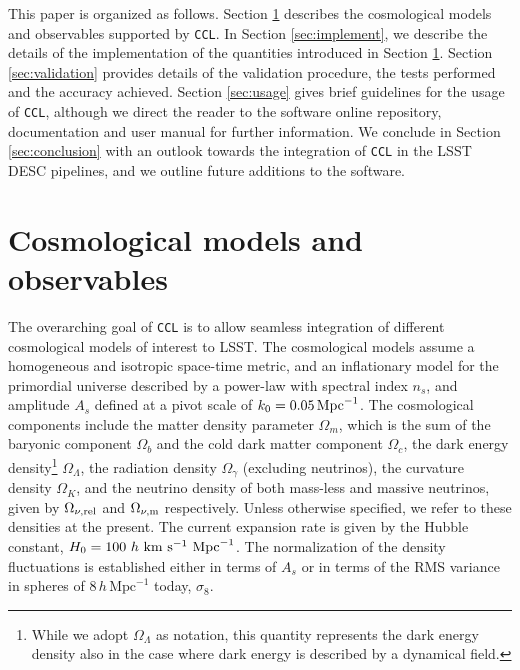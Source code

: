 \documentclass[\docopts]{\docclass}
\newcommand{\ccl}{{\tt CCL}\xspace}
\begin{document}
This paper is organized as follows. Section \ref{sec:models} describes the cosmological models and observables supported by \ccl. In Section \ref{sec:implement}, we describe the details of the implementation of the quantities introduced in Section \ref{sec:models}. Section \ref{sec:validation} provides details of the validation procedure, the tests performed and the accuracy achieved. Section \ref{sec:usage} gives brief guidelines for the usage of \ccl, although we direct the reader to the software online repository, documentation and user manual for further information. We conclude in Section \ref{sec:conclusion} with an outlook towards the integration of \ccl in the LSST DESC pipelines, and we outline future additions to the software. 


\section{Cosmological models and observables}
\label{sec:models}

The overarching goal of \ccl is to allow seamless integration of different cosmological models of interest to LSST. The cosmological models assume a homogeneous and isotropic space-time metric, and an inflationary model for the primordial universe described by a power-law with spectral index $n_s$, and amplitude $A_s$ defined at a pivot scale of $k_0=0.05\,{\rm Mpc}^{-1}$. The cosmological components include the matter density parameter $\Omega_m$, which is the sum of the baryonic component $\Omega_b$ and the cold dark matter component $\Omega_c$, the dark energy density\footnote{While we adopt $\Omega_\Lambda$ as notation, this quantity represents the dark energy density also in the case where dark energy is described by a dynamical field.} $\Omega_\Lambda$, the radiation density $\Omega_\gamma$ (excluding neutrinos), the curvature density $\Omega_K$, and the neutrino density of both mass-less and massive neutrinos, given by $\Omega_{\nu, {\rm rel}}$ and $\Omega_{\nu, {\rm m}}$ respectively. Unless otherwise specified, we refer to these densities at the present. The current expansion rate is given by the Hubble constant, $H_0 = 100~h~{\rm km}~{\rm s}^{-1}~{\rm Mpc}^{-1}$. The normalization of the density fluctuations is established either in terms of $A_s$ or in terms of the RMS variance in spheres of $8\,h\,\text{Mpc}^{-1}$ today, $\sigma_8$. 
\end{document}
